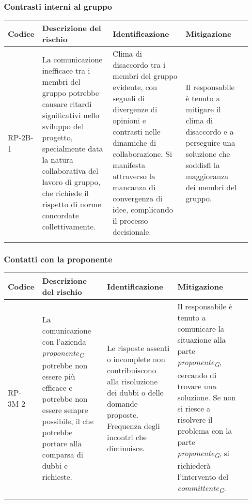 \subsubsection{Contrasti interni al gruppo}
\begin{table}[ht]
    \centering
    \begin{tabularx}{\textwidth}{l>{\RaggedRight}X>{\RaggedRight}X>{\RaggedRight}X>{\RaggedRight}X}
    \toprule
    \rowcolor{gray!50}
    \textbf{Codice} & \textbf{Descrizione del rischio} & \textbf{Identificazione} & \textbf{Mitigazione} \\
    \midrule
    \addlinespace 
    RP-2B-1 & 
    La comunicazione inefficace tra i membri del gruppo potrebbe causare ritardi significativi nello sviluppo del progetto, specialmente data la natura collaborativa del lavoro di gruppo, che richiede il rispetto di norme concordate collettivamente.& 
    Clima di disaccordo tra i membri del gruppo evidente, con segnali di divergenze di opinioni e contrasti nelle dinamiche di collaborazione. Si manifesta attraverso la mancanza di convergenza di idee, complicando il processo decisionale. &
    Il responsabile è tenuto a mitigare il clima di disaccordo e a perseguire una soluzione che soddisfi la maggioranza dei membri del gruppo.\\
    \bottomrule
    \addlinespace 
    \end{tabularx}
\end{table}

\newpage
\subsubsection{Contatti con la proponente}
\begin{table}[ht]
    \centering
    \begin{tabularx}{\textwidth}{l>{\RaggedRight}X>{\RaggedRight}X>{\RaggedRight}X>{\RaggedRight}X}
    \toprule
    \rowcolor{gray!50}
    \textbf{Codice} & \textbf{Descrizione del rischio} & \textbf{Identificazione} & \textbf{Mitigazione} \\
    \midrule
    \addlinespace 
    RP-3M-2 & 
    La comunicazione con l'azienda \textit{proponente}\textsubscript{\textit{G}} potrebbe non essere più efficace e potrebbe non essere sempre possibile, il che potrebbe portare alla comparsa di dubbi e richieste. & 
    Le risposte assenti o incomplete non contribuiscono alla risoluzione dei dubbi o delle domande proposte. Frequenza degli incontri che diminuisce. &
    Il responsabile è tenuto a comunicare la situazione alla parte \textit{proponente}\textsubscript{\textit{G}}, cercando di trovare una soluzione. Se non si riesce a risolvere il problema con la parte \textit{proponente}\textsubscript{\textit{G}}, si richiederà l’intervento del \textit{committente}\textsubscript{\textit{G}}. \\
    \bottomrule
    \addlinespace 
    \end{tabularx}
\end{table}
